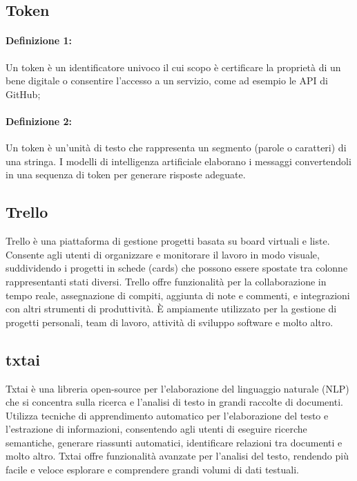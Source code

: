\vspace{2em}
\subsection*{Token}

\paragraph*{Definizione 1:}
Un token è un identificatore univoco il cui scopo è certificare la proprietà di un bene digitale o consentire l'accesso a un servizio, come ad esempio le API di GitHub;

\paragraph*{Definizione 2:}
Un token è un'unità di testo che rappresenta un segmento (parole o caratteri) di una stringa. I modelli di intelligenza artificiale elaborano i messaggi convertendoli in una sequenza di token per generare risposte adeguate.

\vspace{2em}
\subsection*{Trello}
Trello è una piattaforma di gestione progetti basata su board virtuali e liste. Consente agli utenti di organizzare e monitorare il lavoro in modo visuale, suddividendo i progetti in schede (cards) che possono essere spostate tra colonne rappresentanti stati diversi. Trello offre funzionalità per la collaborazione in tempo reale, assegnazione di compiti, aggiunta di note e commenti, e integrazioni con altri strumenti di produttività. È ampiamente utilizzato per la gestione di progetti personali, team di lavoro, attività di sviluppo software e molto altro.

\vspace{2em}
\subsection*{txtai}
Txtai è una libreria open-source per l'elaborazione del linguaggio naturale (NLP) che si concentra sulla ricerca e l'analisi di testo in grandi raccolte di documenti. Utilizza tecniche di apprendimento automatico per l'elaborazione del testo e l'estrazione di informazioni, consentendo agli utenti di eseguire ricerche semantiche, generare riassunti automatici, identificare relazioni tra documenti e molto altro. Txtai offre funzionalità avanzate per l'analisi del testo, rendendo più facile e veloce esplorare e comprendere grandi volumi di dati testuali.
